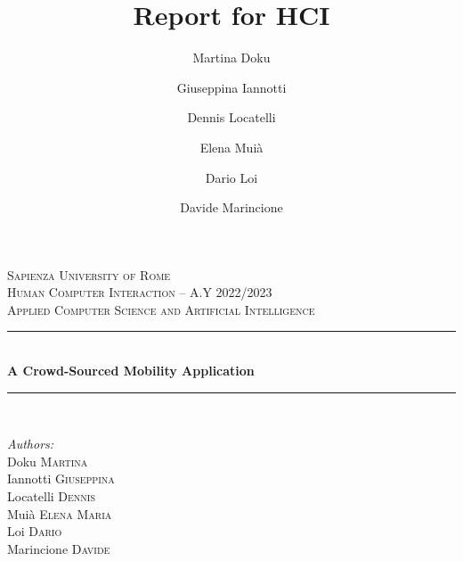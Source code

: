 \documentclass[a4paper, 11pt]{report}
\author{Martina Doku \and Giuseppina Iannotti \and Dennis Locatelli \and Elena Muià \and Dario Loi \and Davide Marincione}
\title{\Huge Report for HCI} %
\begin{document}
\begin{titlepage} %
	\newcommand{\HRule}{\rule{\linewidth}{0.5mm}} %

	\center %


	\textsc{\LARGE Sapienza University of Rome}\\[1.5cm] %

	\textsc{\Large Human Computer Interaction -- A.Y 2022/2023}\\[0.5cm] %

	\textsc{\large Applied Computer Science and Artificial Intelligence}\\[0.5cm] %


	\HRule\\[0.4cm]

	{\huge\bfseries A Crowd-Sourced Mobility Application}\\[0.4cm] %

	\HRule\\[1.5cm]


	\begin{minipage}{0.4\textwidth}
		\begin{flushleft}
			\Large
			\textit{Authors:}\\[3pt]\hspace{2pt} %
			Doku \textsc{Martina}\\[1pt]\hspace{2pt}
			Iannotti \textsc{Giuseppina}\\[1pt]\hspace{2pt}
			Locatelli \textsc{Dennis}\\[1pt]\hspace{2pt}
			Muià \textsc{Elena Maria}\\[1pt]\hspace{2pt}
			Loi \textsc{Dario}\\[1pt]\hspace{2pt}
			Marincione \textsc{Davide}
		\end{flushleft}
	\end{minipage}
	\begin{minipage}{0.4\textwidth}
		\begin{flushright}
		\end{flushright}
	\end{minipage}


\end{titlepage}
\end{document}
